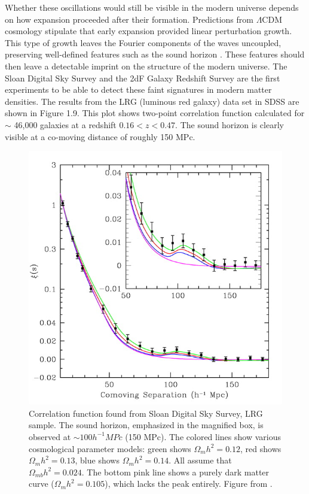 \documentclass{report}
\begin{document}
Whether these oscillations would still be visible in the modern universe depends on how expansion proceeded after their formation. Predictions from $\Lambda$CDM cosmology stipulate that early expansion provided linear perturbation growth. This type of growth leaves the Fourier components of the waves uncoupled, preserving well-defined features such as the sound horizon \cite{Eisenstein2005}. These features should then leave a detectable imprint on the structure of the modern universe. The Sloan Digital Sky Survey and the 2dF Galaxy Redshift Survey are the first experiments to be able to detect these faint signatures in modern matter densities. The results from the LRG (luminous red galaxy) data set in SDSS are shown in Figure 1.9. This plot shows two-point correlation function calculated for $\sim$ 46,000 galaxies at a redshift $0.16 < z < 0.47$. The sound horizon is clearly visible at a co-moving distance of roughly 150 MPc.

\begin{figure}[h]
\centering
\includegraphics[width = .5\textwidth]{BAO_peak.jpg}
\caption{Correlation function found from Sloan Digital Sky Survey, LRG sample. The sound horizon, emphasized in the magnified box, is observed at $\sim 100 h^{-1} MPc$ (150 MPc). The colored lines show various cosmological parameter models: green shows $\Omega_{m}h^2 = 0.12$, red shows $\Omega_{m}h^2 = 0.13$, blue shows $\Omega_{m}h^2 = 0.14$. All assume that $\Omega_{mb}h^2 = 0.024$. The bottom pink line shows a purely dark matter curve ($\Omega_{m}h^2 = 0.105$), which lacks the peak entirely. Figure from \cite{Eisenstein2005}.}
\end{figure}
\end{document}
